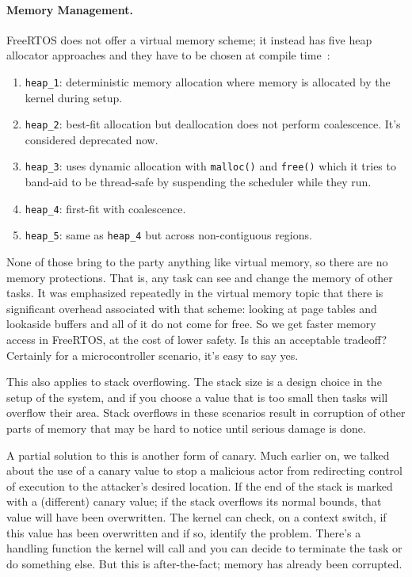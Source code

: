  
\paragraph{Memory Management.} FreeRTOS does not offer a virtual memory scheme; it instead has five heap allocator approaches and they have to be chosen at compile time~\cite{freertos}:

\begin{enumerate}
	\item \texttt{heap\_1}: deterministic memory allocation where memory is allocated by the kernel during setup.
	\item \texttt{heap\_2}: best-fit allocation but deallocation does not perform coalescence. It's considered deprecated now.
	\item \texttt{heap\_3}: uses dynamic allocation with \texttt{malloc()} and \texttt{free()} which it tries to band-aid to be thread-safe by suspending the scheduler while they run.
	\item \texttt{heap\_4}: first-fit with coalescence.
	\item \texttt{heap\_5}: same as \texttt{heap\_4} but across non-contiguous regions.
\end{enumerate}
 
None of those bring to the party anything like virtual memory, so there are no memory protections. That is, any task can see and change the memory of other tasks. It was emphasized repeatedly in the virtual memory topic that there is significant overhead associated with that scheme: looking at page tables and lookaside buffers and all of it do not come for free. So we get faster memory access in FreeRTOS, at the cost of lower safety. Is this an acceptable tradeoff? Certainly for a microcontroller scenario, it's easy to say yes.

This also applies to stack overflowing. The stack size is a design choice in the setup of the system, and if you choose a value that is too small then tasks will overflow their area. Stack overflows in these scenarios result in corruption of other parts of memory that may be hard to notice until serious damage is done. 

A partial solution to this is another form of canary. Much earlier on, we talked about the use of a canary value to stop a malicious actor from redirecting control of execution to the attacker's desired location. If the end of the stack is marked with a (different) canary value; if the stack overflows its normal bounds, that value will have been overwritten. The kernel can check, on a context switch, if this value has been overwritten and if so, identify the problem. There's a handling function the kernel will call and you can decide to terminate the task or do something else. But this is after-the-fact; memory has already been corrupted.

